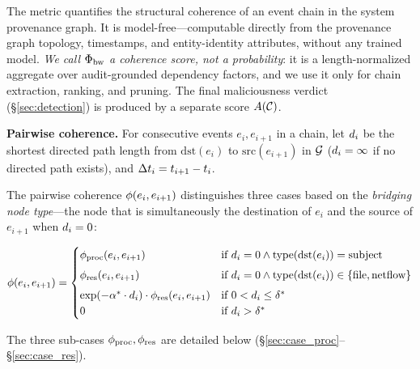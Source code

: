 The metric quantifies the structural coherence of an event chain in the system provenance graph. It is model-free---computable directly from the provenance graph topology, timestamps, and entity-identity attributes, without any trained model. \emph{We call $\Phi_{\text{bw}}$ a coherence score, not a probability}: it is a length-normalized aggregate over audit-grounded dependency factors, and we use it only for chain extraction, ranking, and pruning. The final maliciousness verdict (\S\ref{sec:detection}) is produced by a separate score $A(\mathcal{C})$.

\textbf{Pairwise coherence.} For consecutive events $e_i, e_{i+1}$ in a chain, let $d_i$ be the shortest directed path length from $\text{dst}(e_i)$ to $\text{src}(e_{i+1})$ in $\mathcal{G}$ ($d_i = \infty$ if no directed path exists), and $\Delta t_i = t_{i+1} - t_i$.

The pairwise coherence $\phi(e_i, e_{i+1})$ distinguishes three cases based on the \emph{bridging node type}---the node that is simultaneously the destination of $e_i$ and the source of $e_{i+1}$ when $d_i = 0$:

\begin{equation}
\phi(e_i, e_{i+1}) =
\begin{cases}
\phi_{\text{proc}}(e_i, e_{i+1}) & \text{if } d_i = 0 \land \text{type}(\text{dst}(e_i)) = \text{subject} \\[4pt]
\phi_{\text{res}}(e_i, e_{i+1}) & \text{if } d_i = 0 \land \text{type}(\text{dst}(e_i)) \in \{\text{file}, \text{netflow}\} \\[4pt]
\exp(-\alpha^* \cdot d_i) \cdot \phi_{\text{res}}(e_i, e_{i+1}) & \text{if } 0 < d_i \leq \delta^* \\
0 & \text{if } d_i > \delta^*
\end{cases}
\label{eq:phi}
\end{equation}

The three sub-cases $\phi_{\text{proc}}, \phi_{\text{res}}$ are detailed below (\S\ref{sec:case_proc}--\S\ref{sec:case_res}).

